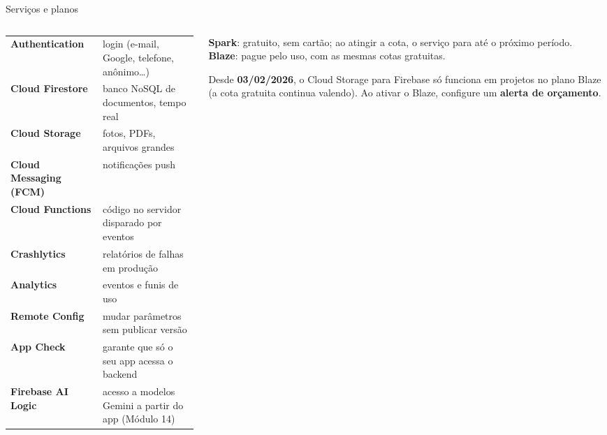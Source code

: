\documentclass[aspectratio=169,10pt]{beamer}
\begin{document}
\begin{frame}{Serviços e planos}
  \begin{columns}[T]
    \begin{column}{0.56\textwidth}
      \scriptsize
      \begin{tabularx}{\linewidth}{@{}l L@{}}
        \toprule
         &  \\
        \midrule
        \textbf{Authentication} & login (e-mail, Google, telefone, anônimo\ldots) \\
        \textbf{Cloud Firestore} & banco NoSQL de documentos, tempo real \\
        \textbf{Cloud Storage} & fotos, PDFs, arquivos grandes \\
        \textbf{Cloud Messaging (FCM)} & notificações push \\
        \textbf{Cloud Functions} & código no servidor disparado por eventos \\
        \textbf{Crashlytics} & relatórios de falhas em produção \\
        \textbf{Analytics} & eventos e funis de uso \\
        \textbf{Remote Config} & mudar parâmetros sem publicar versão \\
        \textbf{App Check} & garante que só o seu app acessa o backend \\
        \textbf{Firebase AI Logic} & acesso a modelos Gemini a partir do app (Módulo 14) \\
        \bottomrule
      \end{tabularx}
    \end{column}
    \begin{column}{0.42\textwidth}
      \begin{conceito}[Planos]
        \textbf{Spark}: gratuito, sem cartão; ao atingir a cota, o serviço para até o próximo período.\\
        \textbf{Blaze}: pague pelo uso, com as mesmas cotas gratuitas.
      \end{conceito}
      \begin{atencao}
        Desde \textbf{03/02/2026}, o Cloud Storage para Firebase só funciona em projetos no plano Blaze (a cota gratuita continua valendo). Ao ativar o Blaze, configure um \textbf{alerta de orçamento}.
      \end{atencao}
    \end{column}
  \end{columns}
\end{frame}
\end{document}
